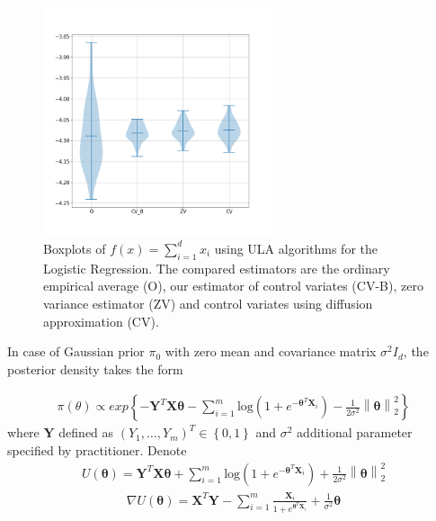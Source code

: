 \documentclass[preprint]{imsart}
\begin{document}
\begin{figure}[h]
\begin{center}
\includegraphics[width=0.6\textwidth]{pictures/BLR_banknotes_4d.png}
\caption{Boxplots of $f(x) = \sum_{i=1}^d x_i$ using ULA algorithms for the Logistic Regression. The compared estimators are the ordinary empirical average  (O), our estimator of control variates (CV-B), zero variance estimator (ZV) and control variates using diffusion approximation (CV).
 \label{fig:2}}
\end{center}
\end{figure}

In case of Gaussian prior $\pi_0$ with zero mean and covariance matrix $\sigma^2 I_d$, the posterior density takes the form


\begin{eqnarray*}
\pi(\theta) \propto exp \left\{ -  \mathbf{Y}^T \mathbf{X \theta} - \sum_{i=1}^m \text{log} (1 + e^{-\mathbf{\theta}^T \mathbf{X}_i}) - \frac{1}{2\sigma^2} \left\| \mathbf{\theta}\right\|_2^2 \right\}
\end{eqnarray*}
where $\mathbf{Y}$ defined as $(Y_1, \dots, Y_m)^T \in \left\{ 0,1\right\}$ and $\sigma^2 $ additional parameter specified by practitioner. Denote 
\begin{eqnarray*}
U( \mathbf{\theta}) = \mathbf{Y}^T \mathbf{X \theta} + \sum_{i=1}^m \text{log} (1 + e^{-\mathbf{\theta}^T \mathbf{X}_i}) + \frac{1}{2\sigma^2} \left\|\mathbf{\theta}\right\|_2^2
\end{eqnarray*}
\begin{eqnarray*}
\nabla U(\mathbf{\theta}) = \mathbf{X}^T \mathbf{Y} - \sum_{i=1}^m \frac{\mathbf{X}_i}{1 + e^{\mathbf{\theta}^T \mathbf{X}_i}} + \frac{1}{\sigma^2} \mathbf{\theta}
\end{eqnarray*}
\end{document}
